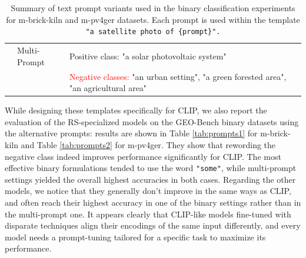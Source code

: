 \documentclass[a4paper, oneside, english]{sapthesis} %
\begin{document}
\begin{table}[H]
\begin{tabular}{llp{8cm}}
  \cmidrule(lr){2-3}
  & Multi-Prompt & \textcolor{customgreen}{Positive class:} "a solar photovoltaic system" \\
  & & \textcolor{red}{Negative classes:} "an urban setting", "a green forested area", "an agricultural area" \\
\bottomrule
\end{tabular}
\vspace{0.3cm}
\caption{Summary of text prompt variants used in the binary classification experiments for m-brick-kiln and m-pv4ger datasets. Each prompt is used within the template \texttt{"a satellite photo of \{prompt\}".}}
\label{tab:prompt_templates}
\end{table}

While designing these templates specifically for CLIP, we also report the evaluation of the RS-specialized models on the GEO-Bench binary datasets using the alternative prompts: results are shown in Table \ref{tab:prompts1} for m-brick-kiln and Table \ref{tab:prompts2} for m-pv4ger. They show that rewording the negative class indeed improves performance significantly for CLIP. The most effective binary formulations tended to use the word \texttt{"some"}, while multi-prompt settings yielded the overall highest accuracies in both cases. Regarding the other models, we notice that they generally don't improve in the same ways as CLIP, and often reach their highest accuracy in one of the binary settings rather than in the multi-prompt one. It appears clearly that CLIP-like models fine-tuned with disparate techniques align their encodings of the same input differently, and every model needs a prompt-tuning tailored for a specific task to maximize its performance.

\vspace{0.5cm}
\end{document}
